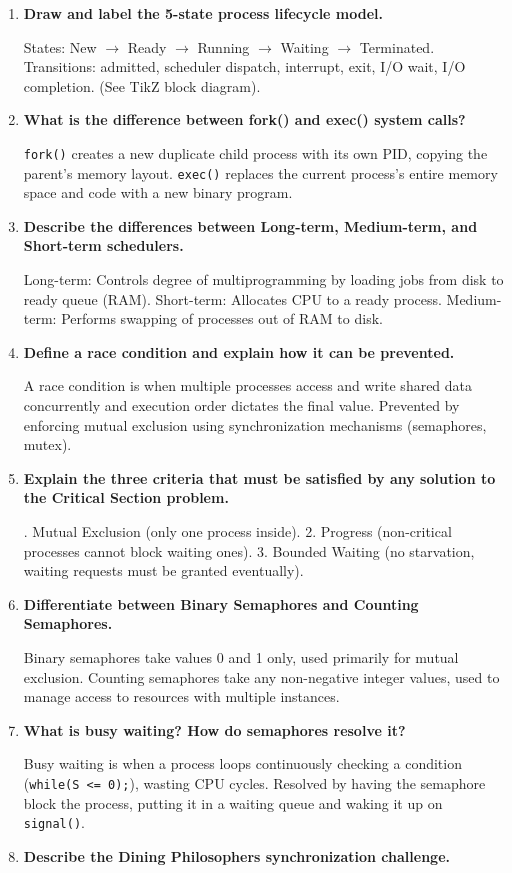 \documentclass[12pt,a4paper]{article}
\newcommand{\Q}[1]{\textbf{#1}\par\noindent\ignorespaces}
\begin{document}
\begin{tcolorbox}[exambox, title={\textbf{Frequently Asked / Viva Questions}}]
\begin{enumerate}[topsep=0pt, label=\textbf{Q\arabic*.}, itemsep=5pt]
  \item \Q{Draw and label the 5-state process lifecycle model.}
    States: New $\to$ Ready $\to$ Running $\to$ Waiting $\to$ Terminated. Transitions: admitted, scheduler dispatch, interrupt, exit, I/O wait, I/O completion. (See TikZ block diagram).
  \item \Q{What is the difference between fork() and exec() system calls?}
    \texttt{fork()} creates a new duplicate child process with its own PID, copying the parent's memory layout. \texttt{exec()} replaces the current process's entire memory space and code with a new binary program.
  \item \Q{Describe the differences between Long-term, Medium-term, and Short-term schedulers.}
    Long-term: Controls degree of multiprogramming by loading jobs from disk to ready queue (RAM). Short-term: Allocates CPU to a ready process. Medium-term: Performs swapping of processes out of RAM to disk.
  \item \Q{Define a race condition and explain how it can be prevented.}
    A race condition is when multiple processes access and write shared data concurrently and execution order dictates the final value. Prevented by enforcing mutual exclusion using synchronization mechanisms (semaphores, mutex).
  \item \Q{Explain the three criteria that must be satisfied by any solution to the Critical Section problem.}
    1. Mutual Exclusion (only one process inside). 2. Progress (non-critical processes cannot block waiting ones). 3. Bounded Waiting (no starvation, waiting requests must be granted eventually).
  \item \Q{Differentiate between Binary Semaphores and Counting Semaphores.}
    Binary semaphores take values 0 and 1 only, used primarily for mutual exclusion. Counting semaphores take any non-negative integer values, used to manage access to resources with multiple instances.
  \item \Q{What is busy waiting? How do semaphores resolve it?}
    Busy waiting is when a process loops continuously checking a condition (\texttt{while(S <= 0);}), wasting CPU cycles. Resolved by having the semaphore block the process, putting it in a waiting queue and waking it up on \texttt{signal()}.
  \item \Q{Describe the Dining Philosophers synchronization challenge.}

\end{enumerate}
\end{tcolorbox}
\end{document}

